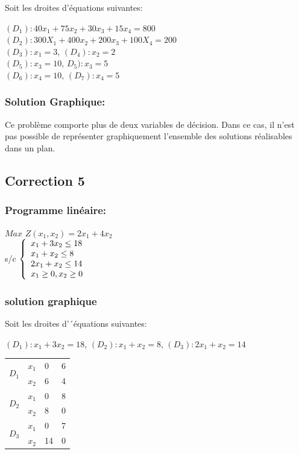 \documentclass[]{book}
\begin{document}
Soit les droites d'équations suivantes:
\begin{center}

	$(D_1): 40 x_1 + 75 x_2 + 30 x_3 + 15 x_4 = 800$\\
    $(D_2): 300 X_1 + 400 x_2 + 200 x_3 + 100 X_4 = 200$\\
    $(D_3): x_1 = 3$, $(D_4): x_2 = 2$\\
    $(D_5): x_3 = 10$, $D_5): x_3 = 5$\\
    $(D_6): x_4 = 10$, $(D_7): x_4 = 5$\\
\end{center}
\subsubsection{Solution Graphique:}
Ce problème comporte plus de deux variables de décision. Dans ce cas, il n’est pas possible de représenter graphiquement l’ensemble des solutions réalisables dans un plan.
\subsection*{Correction 5}
\subsubsection{Programme linéaire:}
$Max$ $Z(x_1,x_2) = 2x_1 + 4x_2$\\
s/c $\left\{
	\begin{array}l
	x_1 + 3x_2 \leq 18\\
    x_1 + x_2 \leq 8\\
    2x_1 + x_2 \leq 14\\
	x_1 \geq 0, x_2 \geq 0\end{array}
	\right.$
\subsubsection{solution graphique}
Soit les droites d’´équations suivantes:
\begin{center}
    $(D_1): x_1 + 3 x_2 = 18$, $(D_2): x_1 + x_2 = 8$, $(D_3): 2 x_1 + x_2 = 14 $
\end{center}

\begin{center}
    \begin{tabular}{ | m{0.5cm} | m{0.5cm}| m{1cm} | m{1cm} | } 
      \hline
        \multirow{2}{4em}{$D_1$} & $x_1$  & 0 & 6 \\
        \cline{2-4} & $x_2$  & 6 & 4 \\
        \hline
        
        \multirow{2}{4em}{$D_2$} & $x_1$ & 0 & 8 \\
        \cline{2-4} & $x_2$ & 8 & 0 \\
        \hline
        
        \multirow{2}{4em}{$D_3$} & $x_1$ & 0 & 7 \\
        \cline{2-4} & $x_2$ & 14 & 0\\
        \hline
    \end{tabular}
\end{center}
\end{document}
